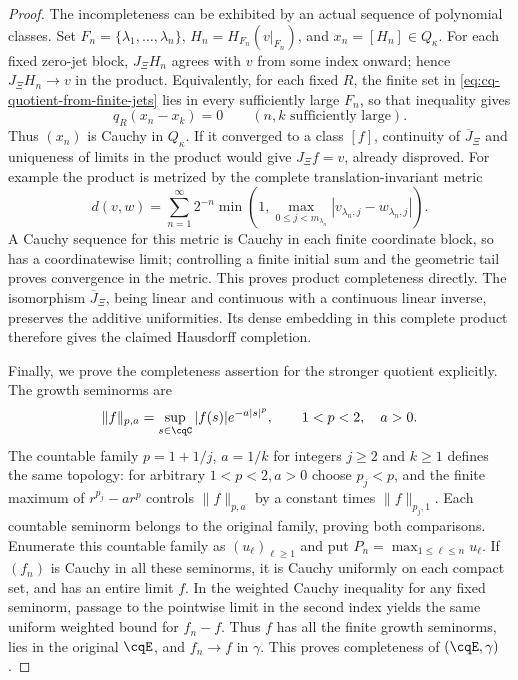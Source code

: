 \begin{proof}
The incompleteness can be exhibited by an actual sequence of
polynomial classes. Set $F_n=\{\lambda_1,\ldots,\lambda_n\}$,
$H_n=H_{F_n}(v|_{F_n})$, and $x_n=[H_n]\in Q_\kappa$.
For each fixed zero-jet block, $J_\Xi H_n$ agrees with $v$
from some index onward; hence $J_\Xi H_n\to v$ in the product.
Equivalently, for each fixed $R$, the finite set in
\eqref{eq:cq-quotient-from-finite-jets} lies in every sufficiently
large $F_n$, so that inequality gives
\[
 q_R(x_n-x_k)=0\qquad(n,k\text{ sufficiently large}).
\]
Thus $(x_n)$ is Cauchy in $Q_\kappa$. If it converged to a
class $[f]$, continuity of $\overline J_\Xi$ and uniqueness of
limits in the product would give $J_\Xi f=v$, already disproved.
For example the product is metrized by the complete
translation-invariant metric
\[
 d(v,w)=\sum_{n=1}^\infty2^{-n}
       \min\!\left(1,\max_{0\leq j<m_{\lambda_n}}
                          |v_{\lambda_n,j}-w_{\lambda_n,j}|\right).
\]
A Cauchy sequence for this metric is Cauchy in each finite
coordinate block, so has a coordinatewise limit; controlling a
finite initial sum and the geometric tail proves convergence in
the metric. This proves product completeness directly. The
isomorphism $\overline J_\Xi$, being linear and continuous
with a continuous linear inverse, preserves the additive
uniformities. Its dense embedding in this complete product
therefore gives the claimed Hausdorff completion.

Finally, we prove the completeness assertion for the stronger
quotient explicitly. The growth seminorms are
\[
 \|f\|_{p,a}=\sup_{s\in\cqC}|f(s)|e^{-a|s|^p},
 \qquad 1<p<2,\quad a>0.
\]
The countable family $p=1+1/j$, $a=1/k$ for integers $j\geq2$
and $k\geq1$ defines the same topology: for arbitrary $1<p<2,a>0$
choose $p_j<p$, and the finite maximum of
$r^{p_j}-ar^p$ controls $\|f\|_{p,a}$ by a constant times
$\|f\|_{p_j,1}$. Each countable seminorm belongs to the original
family, proving both comparisons. Enumerate this countable family
as $(u_\ell)_{\ell\geq1}$ and put
$P_n=\max_{1\leq\ell\leq n}u_\ell$.
If $(f_n)$ is Cauchy in all these seminorms, it is Cauchy uniformly
on each compact set, and has an entire limit $f$. In the weighted
Cauchy inequality for any fixed seminorm, passage to the
pointwise limit in the second index yields the same uniform
weighted bound for $f_n-f$. Thus $f$ has all the finite growth
seminorms, lies in the original $\cqE$, and $f_n\to f$ in
$\gamma$. This proves completeness of $(\cqE,\gamma)$.


\end{proof}
